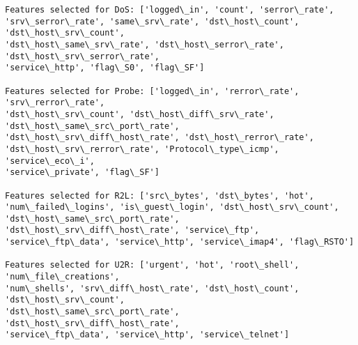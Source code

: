 \documentclass[11pt]{article}
\begin{document}
    \begin{Verbatim}[commandchars=\\\{\}]
Features selected for DoS: ['logged\_in', 'count', 'serror\_rate',
'srv\_serror\_rate', 'same\_srv\_rate', 'dst\_host\_count', 'dst\_host\_srv\_count',
'dst\_host\_same\_srv\_rate', 'dst\_host\_serror\_rate', 'dst\_host\_srv\_serror\_rate',
'service\_http', 'flag\_S0', 'flag\_SF']

Features selected for Probe: ['logged\_in', 'rerror\_rate', 'srv\_rerror\_rate',
'dst\_host\_srv\_count', 'dst\_host\_diff\_srv\_rate', 'dst\_host\_same\_src\_port\_rate',
'dst\_host\_srv\_diff\_host\_rate', 'dst\_host\_rerror\_rate',
'dst\_host\_srv\_rerror\_rate', 'Protocol\_type\_icmp', 'service\_eco\_i',
'service\_private', 'flag\_SF']

Features selected for R2L: ['src\_bytes', 'dst\_bytes', 'hot',
'num\_failed\_logins', 'is\_guest\_login', 'dst\_host\_srv\_count',
'dst\_host\_same\_src\_port\_rate', 'dst\_host\_srv\_diff\_host\_rate', 'service\_ftp',
'service\_ftp\_data', 'service\_http', 'service\_imap4', 'flag\_RSTO']

Features selected for U2R: ['urgent', 'hot', 'root\_shell', 'num\_file\_creations',
'num\_shells', 'srv\_diff\_host\_rate', 'dst\_host\_count', 'dst\_host\_srv\_count',
'dst\_host\_same\_src\_port\_rate', 'dst\_host\_srv\_diff\_host\_rate',
'service\_ftp\_data', 'service\_http', 'service\_telnet']
    \end{Verbatim}
\end{document}
